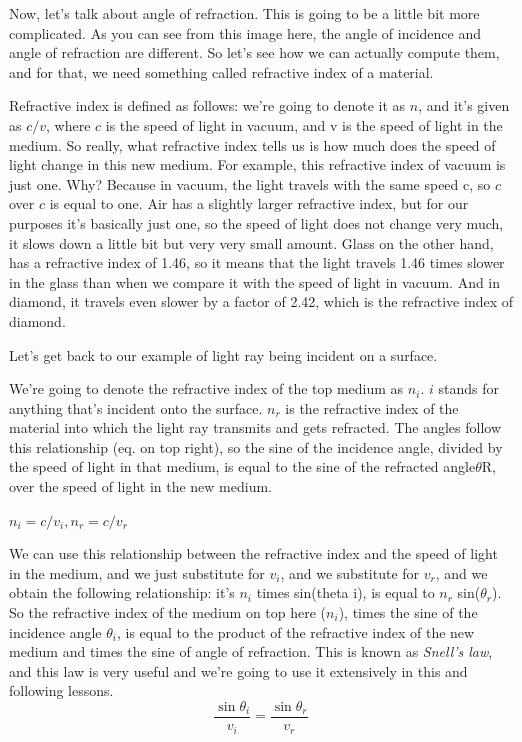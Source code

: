 Now, let's talk about angle of refraction. This is going to be a little bit more complicated. As you can see from this image here, the angle of incidence and angle of refraction are different. So let's see how we can actually compute them, and for that, we need something called refractive index of a material.

Refractive index is defined as follows: we're going to denote it as $n$, and it's given as $c/v$, where $c$ is the speed of light in vacuum, and v is the speed of light in the medium. So really, what refractive index tells us is how much does the speed of light change in this new medium. For example, this refractive index of vacuum is just one. Why? Because in vacuum, the light travels with the same speed c, so $c$ over $c$ is equal to one. Air has a slightly larger refractive index, but for our purposes it's basically just one, so the speed of light does not change very much, it slows down a little bit but very very small amount. Glass on the other hand, has a refractive index of 1.46, so it means that the light travels 1.46 times slower in the glass than when we compare it with the speed of light in vacuum. And in diamond, it travels even slower by a factor of 2.42, which is the refractive index of diamond.

Let's get back to our example of light ray being incident on a surface.

We're going to denote the refractive index of the top medium as $n_i$. $i$ stands for anything that's incident onto the surface. $n_r$ is the refractive index of the material into which the light ray transmits and gets refracted. The angles follow this relationship (eq. on top right), so the sine of the incidence angle, divided by the speed of light in that medium, is equal to the sine of the refracted angle$\theta$R, over the speed of light in the new medium.

$n_i=c / v_i, n_r=c / v_r$

We can use this relationship between the refractive index and the speed of light in the medium, and we just substitute for $v_i$, and we substitute for $v_r$, and we obtain the following relationship: it's $n_i$ times sin(theta i), is equal to $n_r$ sin($\theta_r$). So the refractive index of the medium on top here ($n_i$), times the sine of the incidence angle $\theta_i$, is equal to the product of the refractive index of the new medium and times the sine of angle of refraction. This is known as \emph{Snell's law}, and this law is very useful and we're going to use it extensively in this and following lessons.
\begin{equation}
\frac{\sin \theta_i}{v_i}=\frac{\sin \theta_r}{v_r}
\end{equation}


